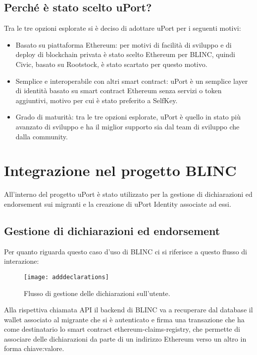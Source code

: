 \subsection{Perché è stato scelto uPort?}

Tra le tre opzioni esplorate si è deciso di adottare uPort per i seguenti motivi:

\begin{itemize}
    \item Basato su piattaforma Ethereum: per motivi di facilità di sviluppo e di deploy di blockchain privata è stato scelto
    Ethereum per BLINC, quindi Civic, basato su Rootstock, è stato scartato per questo motivo.
    \item Semplice e interoperabile con altri smart contract: uPort è un semplice layer di identità basato su 
    smart contract Ethereum senza servizi o token aggiuntivi, motivo per cui è stato preferito a SelfKey.
    \item Grado di maturità: tra le tre opzioni esplorate, uPort è quello in stato più avanzato di sviluppo e ha il miglior supporto
    sia dal team di sviluppo che dalla community.
\end{itemize}

\section{Integrazione nel progetto BLINC}

All’interno del progetto uPort è stato utilizzato per la gestione di dichiarazioni
ed endorsement sui migranti e la creazione di uPort Identity associate ad essi.

\subsection{Gestione di dichiarazioni ed endorsement}
Per quanto riguarda questo caso d’uso di BLINC ci si
riferisce a questo flusso di interazione:

\begin{figure}[!ht]
    \texttt{[image: adddeclarations]}
    \caption{Flusso di gestione delle dichiarazioni sull'utente.}
    \label{fig:adddeclarations}
  \end{figure}

Alla rispettiva chiamata API il backend di BLINC va a recuperare dal database
il wallet associato al migrante che si è autenticato e firma una transazione
che ha come destinatario lo smart contract ethereum-claims-registry, che permette
di associare delle dichiarazioni da parte di un indirizzo Ethereum 
verso un altro in forma chiave:valore.

